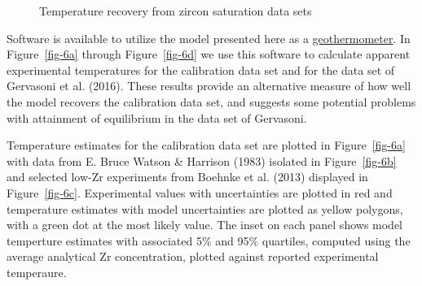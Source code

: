\documentclass[
]{agujournal2019}
\begin{document}
\begin{figure}
\begin{minipage}{\linewidth}
{}


\end{minipage}%

\caption{\label{fig-6}Temperature recovery from zircon saturation data
sets}

\end{figure}%

Software is available to utilize the model presented here as a
\href{notebooks/6-Liquid-MELTS-calib-2.ipynb}{geothermometer}. In
Figure~\ref{fig-6a} through Figure~\ref{fig-6d} we use this software to
calculate apparent experimental temperatures for the calibration data
set and for the data set of Gervasoni et al. (2016). These results
provide an alternative measure of how well the model recovers the
calibration data set, and suggests some potential problems with
attainment of equilibrium in the data set of Gervasoni.

Temperature estimates for the calibration data set are plotted in
Figure~\ref{fig-6a} with data from E. Bruce Watson \& Harrison (1983)
isolated in Figure~\ref{fig-6b} and selected low-Zr experiments from
Boehnke et al. (2013) displayed in Figure~\ref{fig-6c}. Experimental
values with uncertainties are plotted in red and temperature estimates
with model uncertainties are plotted as yellow polygons, with a green
dot at the most likely value. The inset on each panel shows model
temperture estimates with associated 5\% and 95\% quartiles, computed
using the average analytical Zr concentration, plotted against reported
experimental temperaure.
\end{document}
